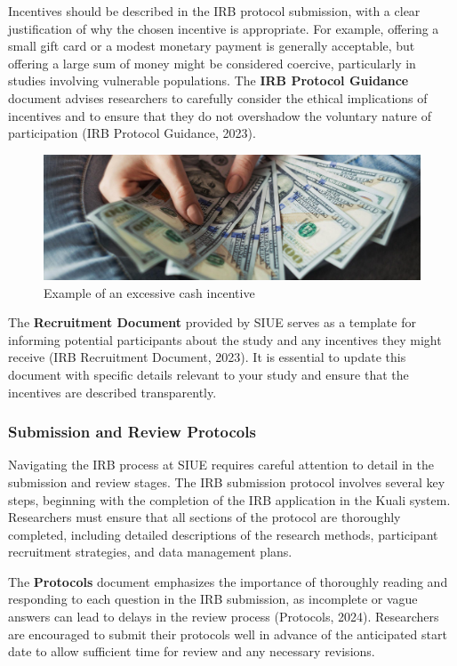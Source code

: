 \documentclass[
]{book}
\begin{document}
Incentives should be described in the IRB protocol submission, with a clear justification of why the chosen incentive is appropriate. For example, offering a small gift card or a modest monetary payment is generally acceptable, but offering a large sum of money might be considered coercive, particularly in studies involving vulnerable populations. The \textbf{IRB Protocol Guidance} document advises researchers to carefully consider the ethical implications of incentives and to ensure that they do not overshadow the voluntary nature of participation (IRB Protocol Guidance, 2023).

\begin{figure}
\centering
\includegraphics{images/fig01e.jpg}
\caption{Example of an excessive cash incentive}
\end{figure}

The \textbf{Recruitment Document} provided by SIUE serves as a template for informing potential participants about the study and any incentives they might receive (IRB Recruitment Document, 2023). It is essential to update this document with specific details relevant to your study and ensure that the incentives are described transparently.

\subsubsection*{Submission and Review Protocols}\label{submission-and-review-protocols}

Navigating the IRB process at SIUE requires careful attention to detail in the submission and review stages. The IRB submission protocol involves several key steps, beginning with the completion of the IRB application in the Kuali system. Researchers must ensure that all sections of the protocol are thoroughly completed, including detailed descriptions of the research methods, participant recruitment strategies, and data management plans.

The \textbf{Protocols} document emphasizes the importance of thoroughly reading and responding to each question in the IRB submission, as incomplete or vague answers can lead to delays in the review process (Protocols, 2024). Researchers are encouraged to submit their protocols well in advance of the anticipated start date to allow sufficient time for review and any necessary revisions.
\end{document}
